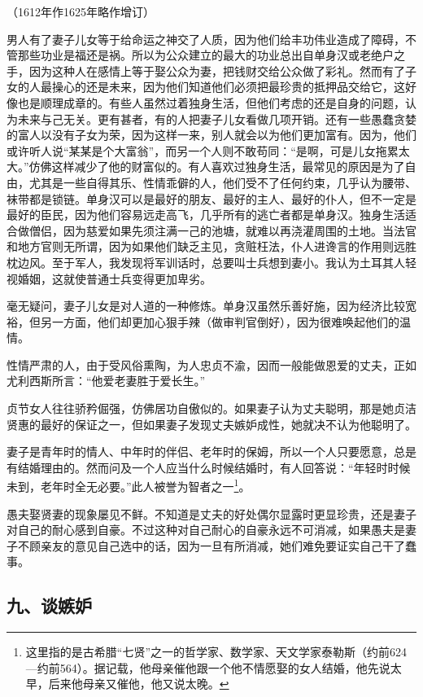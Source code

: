 \begin{center}
    （1612年作1625年略作增订）
\end{center}
\par 男人有了妻子儿女等于给命运之神交了人质，因为他们给丰功伟业造成了障碍，不管那些功业是福还是祸。所以为公众建立的最大的功业总出自单身汉或老绝户之手，因为这种人在感情上等于娶公众为妻，把钱财交给公众做了彩礼。然而有了子女的人最操心的还是未来，因为他们知道他们必须把最珍贵的抵押品交给它，这好像也是顺理成章的。有些人虽然过着独身生活，但他们考虑的还是自身的问题，认为未来与己无关。更有甚者，有的人把妻子儿女看做几项开销。还有一些愚蠢贪婪的富人以没有子女为荣，因为这样一来，别人就会以为他们更加富有。因为，他们或许听人说“某某是个大富翁”，而另一个人则不敢苟同：“是啊，可是儿女拖累太大。”仿佛这样减少了他的财富似的。有人喜欢过独身生活，最常见的原因是为了自由，尤其是一些自得其乐、性情乖僻的人，他们受不了任何约束，几乎认为腰带、袜带都是锁链。单身汉可以是最好的朋友、最好的主人、最好的仆人，但不一定是最好的臣民，因为他们容易远走高飞，几乎所有的逃亡者都是单身汉。独身生活适合做僧侣，因为慈爱如果先须注满一己的池塘，就难以再浇灌周围的土地。当法官和地方官则无所谓，因为如果他们缺乏主见，贪赃枉法，仆人进谗言的作用则远胜枕边风。至于军人，我发现将军训话时，总要叫士兵想到妻小。我认为土耳其人轻视婚姻，这就使普通士兵变得更加卑劣。
\par 毫无疑问，妻子儿女是对人道的一种修炼。单身汉虽然乐善好施，因为经济比较宽裕，但另一方面，他们却更加心狠手辣（做审判官倒好），因为很难唤起他们的温情。
\par 性情严肃的人，由于受风俗熏陶，为人忠贞不渝，因而一般能做恩爱的丈夫，正如尤利西斯所言：“他爱老妻胜于爱长生。”
\par 贞节女人往往骄矜倔强，仿佛居功自傲似的。如果妻子认为丈夫聪明，那是她贞洁贤惠的最好的保证之一，但如果妻子发现丈夫嫉妒成性，她就决不认为他聪明了。
\par 妻子是青年时的情人、中年时的伴侣、老年时的保姆，所以一个人只要愿意，总是有结婚理由的。然而问及一个人应当什么时候结婚时，有人回答说：“年轻时时候未到，老年时全无必要。”此人被誉为智者之一\footnote{这里指的是古希腊“七贤”之一的哲学家、数学家、天文学家泰勒斯（约前624—约前564）。据记载，他母亲催他跟一个他不情愿娶的女人结婚，他先说太早，后来他母亲又催他，他又说太晚。}。
\par 愚夫娶贤妻的现象屡见不鲜。不知道是丈夫的好处偶尔显露时更显珍贵，还是妻子对自己的耐心感到自豪。不过这种对自己耐心的自豪永远不可消减，如果愚夫是妻子不顾亲友的意见自己选中的话，因为一旦有所消减，她们难免要证实自己干了蠢事。



\subsection*{九、谈嫉妒}

